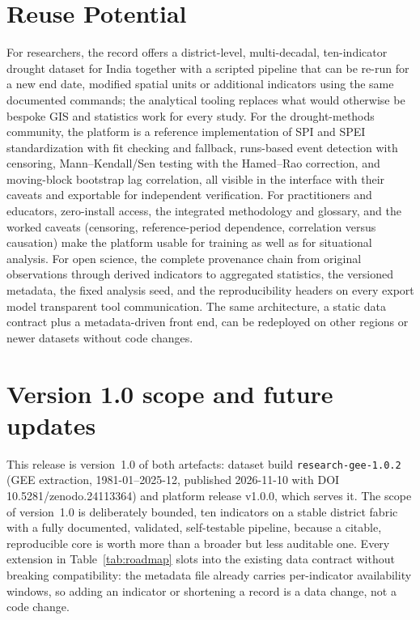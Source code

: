 \documentclass[10pt,a4paper]{article}
\begin{document}
\section*{Reuse Potential}
For researchers, the record offers a district-level, multi-decadal, ten-indicator drought dataset for India together with a scripted pipeline that can be re-run for a new end date, modified spatial units or additional indicators using the same documented commands; the analytical tooling replaces what would otherwise be bespoke GIS and statistics work for every study. For the drought-methods community, the platform is a reference implementation of SPI and SPEI standardization with fit checking and fallback, runs-based event detection with censoring, Mann--Kendall/Sen testing with the Hamed--Rao correction, and moving-block bootstrap lag correlation, all visible in the interface with their caveats and exportable for independent verification. For practitioners and educators, zero-install access, the integrated methodology and glossary, and the worked caveats (censoring, reference-period dependence, correlation versus causation) make the platform usable for training as well as for situational analysis. For open science, the complete provenance chain from original observations through derived indicators to aggregated statistics, the versioned metadata, the fixed analysis seed, and the reproducibility headers on every export model transparent tool communication. The same architecture, a static data contract plus a metadata-driven front end, can be redeployed on other regions or newer datasets without code changes.

\section*{Version 1.0 scope and future updates}
This release is version~1.0 of both artefacts: dataset build \texttt{research-gee-1.0.2} (GEE extraction, 1981-01--2025-12, published 2026-11-10 with DOI 10.5281/zenodo.24113364) and platform release v1.0.0, which serves it. The scope of version~1.0 is deliberately bounded, ten indicators on a stable district fabric with a fully documented, validated, self-testable pipeline, because a citable, reproducible core is worth more than a broader but less auditable one. Every extension in Table~\ref{tab:roadmap} slots into the existing data contract without breaking compatibility: the metadata file already carries per-indicator availability windows, so adding an indicator or shortening a record is a data change, not a code change.
\end{document}
